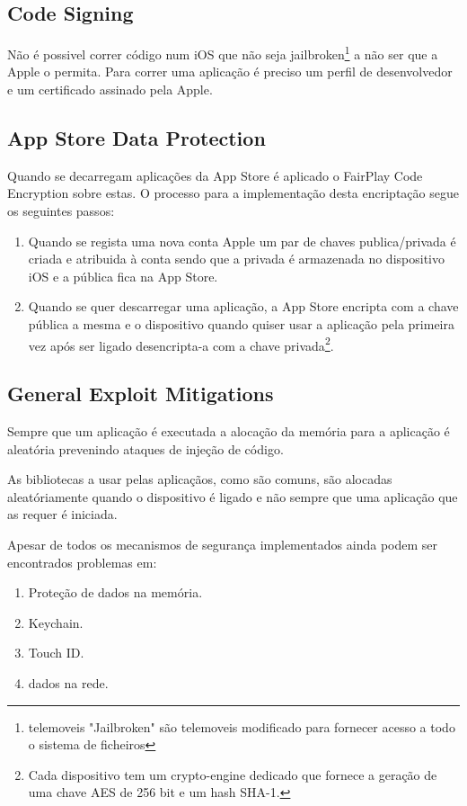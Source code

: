 \subsection{ Code Signing}
\hfill\par
	Não é possivel correr código num iOS que não seja jailbroken\footnote[3]{telemoveis "Jailbroken" são telemoveis modificado para fornecer acesso a todo o sistema de ficheiros\cite{ref_intro2}} a não ser que a Apple o permita. Para correr uma aplicação é preciso um perfil de desenvolvedor e um certificado assinado pela Apple.


\subsection{ App Store Data Protection}
\hfill\par
	Quando se decarregam aplicações da App Store é aplicado o FairPlay Code Encryption sobre estas. O processo para a implementação desta encriptação segue os seguintes passos:\par
	\begin{enumerate}
	\item Quando se regista uma nova conta Apple um par de chaves publica/privada é criada e atribuida à conta sendo que a privada é armazenada no dispositivo iOS e a pública fica na App Store.\par
	\item Quando se quer descarregar uma aplicação, a App Store encripta com a chave pública a mesma e o dispositivo quando quiser usar a aplicação pela primeira vez após ser ligado desencripta-a com a chave privada\footnote[3]{Cada dispositivo tem um crypto-engine dedicado que fornece a geração de uma chave AES de 256 bit e um hash SHA-1.}.\par
\end{enumerate}

\subsection{ General Exploit Mitigations}
\hfill\par
	Sempre que um aplicação é executada a alocação da memória para a aplicação é aleatória prevenindo ataques de injeção de código.\par
	As bibliotecas a usar pelas aplicaçãos, como são comuns, são alocadas aleatóriamente quando o dispositivo é ligado e não sempre que uma aplicação que as requer é iniciada.\par
\hfill\par
\hfill\par
Apesar de todos os mecanismos de segurança implementados ainda podem ser encontrados problemas em:
\renewcommand{\theenumi}{\Roman{enumi}}
\begin{enumerate}
	\item Proteção de dados na memória.
	\item Keychain.
	\item Touch ID.
	\item dados na rede.
\end{enumerate}
\renewcommand{\theenumi}{\arabic{enumi}}



